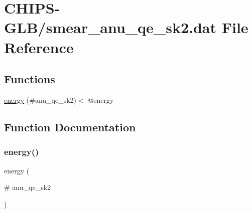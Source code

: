 \hypertarget{smear__anu__qe__sk2_8dat}{}\section{C\+H\+I\+P\+S-\/\+G\+L\+B/smear\+\_\+anu\+\_\+qe\+\_\+sk2.dat File Reference}
\label{smear__anu__qe__sk2_8dat}
\subsection*{Functions}
\begin{DoxyCompactItemize}
\item 
\hyperlink{smear__anu__qe__sk2_8dat_a418eeba05e318d1e6ba6507c599c6b47}{energy} (\#anu\+\_\+qe\+\_\+sk2)$<$ @energy
\end{DoxyCompactItemize}


\subsection{Function Documentation}
\mbox{\label{smear__anu__qe__sk2_8dat_a418eeba05e318d1e6ba6507c599c6b47}} 
\subsubsection{\texorpdfstring{energy()}{energy()}}
{\footnotesize\ttfamily energy (\begin{DoxyParamCaption}\item[{\#}]{anu\+\_\+qe\+\_\+sk2 }\end{DoxyParamCaption})}

